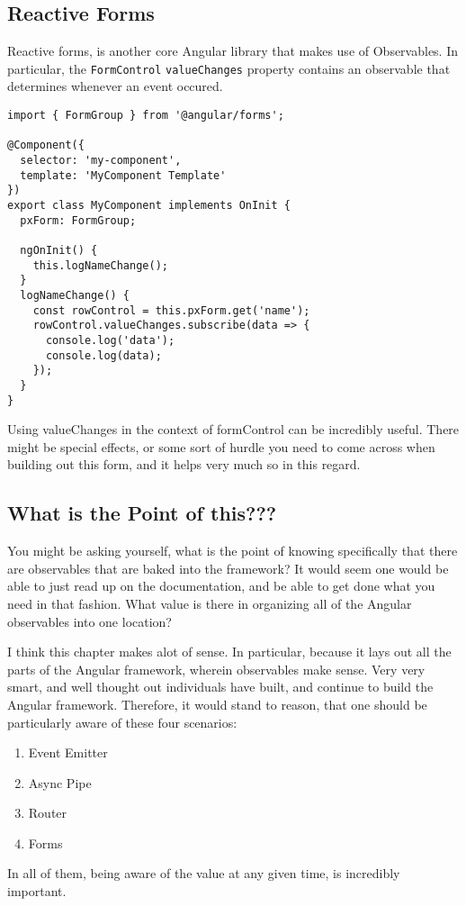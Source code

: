 \subsection{ Reactive Forms }
Reactive forms, is another core Angular library that makes use of Observables. 
In particular, the \lstinline{FormControl} \lstinline{valueChanges} property 
contains an observable that determines whenever an event occured. 
\begin{lstlisting}
import { FormGroup } from '@angular/forms';

@Component({
  selector: 'my-component',
  template: 'MyComponent Template'
})
export class MyComponent implements OnInit {
  pxForm: FormGroup;

  ngOnInit() {
    this.logNameChange();
  }
  logNameChange() {
    const rowControl = this.pxForm.get('name');
    rowControl.valueChanges.subscribe(data => {
      console.log('data');
      console.log(data);
    });
  }
}  
\end{lstlisting}

Using valueChanges in the context of formControl can be incredibly useful. 
There might be special effects, or some sort of hurdle you need to come 
across when building out this form, and it helps very much so in this 
regard. 


\subsection{What is the Point of this??? }
You might be asking yourself, what is the point of knowing specifically that 
there are observables that are baked into the framework? It would seem one 
would be able to just read up on the documentation, and be able to get done 
what you need in that fashion. What value is there in organizing all of the 
Angular observables into one location? 

I think this chapter makes alot of sense. In particular, because it lays out
all the parts of the Angular framework, wherein observables make sense. Very 
very smart, and well thought out individuals have built, and continue to build
the Angular framework. Therefore, it would stand to reason, that one should 
be particularly aware of these four scenarios: 
\begin{enumerate}
  \item Event Emitter
  \item Async Pipe
  \item Router
  \item Forms
\end{enumerate}

In all of them, being aware of the value at any given time, is incredibly 
important. 
